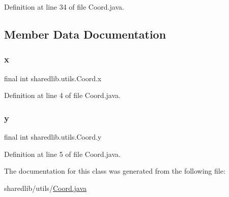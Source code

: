 Definition at line 34 of file Coord.\+java.



\subsection{Member Data Documentation}
\hypertarget{classsharedlib_1_1utils_1_1_coord_a97ec9bc6bdd9e2ccf529d47c13b038ad}{}\label{classsharedlib_1_1utils_1_1_coord_a97ec9bc6bdd9e2ccf529d47c13b038ad} 
\subsubsection{\texorpdfstring{x}{x}}
{\footnotesize\ttfamily final int sharedlib.\+utils.\+Coord.\+x}



Definition at line 4 of file Coord.\+java.

\hypertarget{classsharedlib_1_1utils_1_1_coord_a388e7f4ee703efeac9bfb152cea6c248}{}\label{classsharedlib_1_1utils_1_1_coord_a388e7f4ee703efeac9bfb152cea6c248} 
\subsubsection{\texorpdfstring{y}{y}}
{\footnotesize\ttfamily final int sharedlib.\+utils.\+Coord.\+y}



Definition at line 5 of file Coord.\+java.



The documentation for this class was generated from the following file\+:\begin{DoxyCompactItemize}
\item 
sharedlib/utils/\hyperlink{_coord_8java}{Coord.\+java}\end{DoxyCompactItemize}

